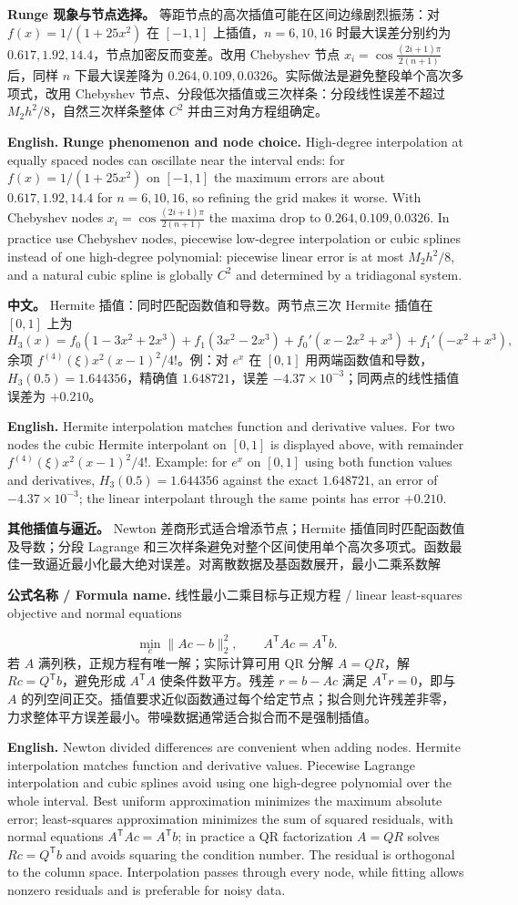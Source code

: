 \documentclass[UTF8,11pt,a4paper]{ctexart}
\newcommand{\EN}[1]{\par\noindent\textbf{English.} #1\par}
\newcommand{\FORMULA}[2]{\par\noindent\textbf{公式名称 / Formula name.} #1 / #2\par}
\newcommand{\APS}[2]{\par\noindent\textbf{中文。} #1\par\noindent\textbf{English.} #2\par\smallskip}
\begin{document}
\noindent\textbf{Runge 现象与节点选择。} 等距节点的高次插值可能在区间边缘剧烈振荡：对 $f(x)=1/(1+25x^2)$ 在 $[-1,1]$ 上插值，$n=6,10,16$ 时最大误差分别约为 $0.617,1.92,14.4$，节点加密反而变差。改用 Chebyshev 节点 $x_i=\cos\frac{(2i+1)\pi}{2(n+1)}$ 后，同样 $n$ 下最大误差降为 $0.264,0.109,0.0326$。实际做法是避免整段单个高次多项式，改用 Chebyshev 节点、分段低次插值或三次样条：分段线性误差不超过 $M_2h^2/8$，自然三次样条整体 $C^2$ 并由三对角方程组确定。
\EN{\textbf{Runge phenomenon and node choice.} High-degree interpolation at equally spaced nodes can oscillate near the interval ends: for $f(x)=1/(1+25x^2)$ on $[-1,1]$ the maximum errors are about $0.617,1.92,14.4$ for $n=6,10,16$, so refining the grid makes it worse. With Chebyshev nodes $x_i=\cos\frac{(2i+1)\pi}{2(n+1)}$ the maxima drop to $0.264,0.109,0.0326$. In practice use Chebyshev nodes, piecewise low-degree interpolation or cubic splines instead of one high-degree polynomial: piecewise linear error is at most $M_2h^2/8$, and a natural cubic spline is globally $C^2$ and determined by a tridiagonal system.}
\APS{Hermite 插值：同时匹配函数值和导数。两节点三次 Hermite 插值在 $[0,1]$ 上为
\[
H_3(x)=f_0(1-3x^2+2x^3)+f_1(3x^2-2x^3)+f_0'(x-2x^2+x^3)+f_1'(-x^2+x^3),
\]
余项 $f^{(4)}(\xi)x^2(x-1)^2/4!$。例：对 $e^x$ 在 $[0,1]$ 用两端函数值和导数，$H_3(0.5)=1.644356$，精确值 $1.648721$，误差 $-4.37\times10^{-3}$；同两点的线性插值误差为 $+0.210$。}{Hermite interpolation matches function and derivative values. For two nodes the cubic Hermite interpolant on $[0,1]$ is displayed above, with remainder $f^{(4)}(\xi)x^2(x-1)^2/4!$. Example: for $e^x$ on $[0,1]$ using both function values and derivatives, $H_3(0.5)=1.644356$ against the exact $1.648721$, an error of $-4.37\times10^{-3}$; the linear interpolant through the same points has error $+0.210$.}

\noindent\textbf{其他插值与逼近。} Newton 差商形式适合增添节点；Hermite 插值同时匹配函数值及导数；分段 Lagrange 和三次样条避免对整个区间使用单个高次多项式。函数最佳一致逼近最小化最大绝对误差。对离散数据及基函数展开，最小二乘系数解
\FORMULA{线性最小二乘目标与正规方程}{linear least-squares objective and normal equations}
\[
\min_c\|Ac-b\|_2^2,\qquad A^{\mathsf T}Ac=A^{\mathsf T}b.
\]
若 $A$ 满列秩，正规方程有唯一解；实际计算可用 QR 分解 $A=QR$，解 $Rc=Q^{\mathsf T}b$，避免形成 $A^{\mathsf T}A$ 使条件数平方。残差 $r=b-Ac$ 满足 $A^{\mathsf T}r=0$，即与 $A$ 的列空间正交。插值要求近似函数通过每个给定节点；拟合则允许残差非零，力求整体平方误差最小。带噪数据通常适合拟合而不是强制插值。
\EN{Newton divided differences are convenient when adding nodes. Hermite interpolation matches function and derivative values. Piecewise Lagrange interpolation and cubic splines avoid using one high-degree polynomial over the whole interval. Best uniform approximation minimizes the maximum absolute error; least-squares approximation minimizes the sum of squared residuals, with normal equations $A^{\mathsf T}Ac=A^{\mathsf T}b$; in practice a QR factorization $A=QR$ solves $Rc=Q^{\mathsf T}b$ and avoids squaring the condition number. The residual is orthogonal to the column space. Interpolation passes through every node, while fitting allows nonzero residuals and is preferable for noisy data.}
\end{document}
